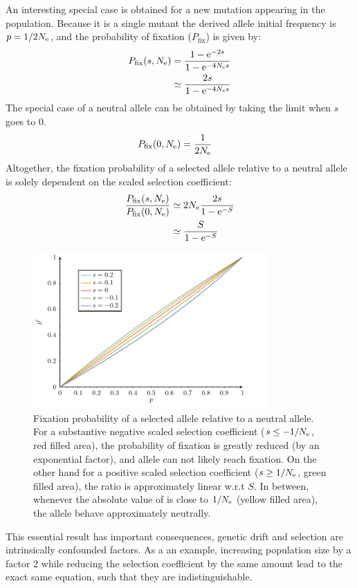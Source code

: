 An interesting special case is obtained for a new mutation appearing in the population.
Because it is a single mutant the derived \gls{allele} initial frequency is $p = 1 / 2 N_{\textrm{e}}$, and the probability of fixation ($P_{\mathrm{fix}}$) is given by:
\begin{align}
	P_{\mathrm{fix}}(s, N_{\textrm{e}}) & = \dfrac{1 - \mathrm{e}^{-2 s}}{1 - \mathrm{e}^{-4 N_{\textrm{e}} s}} \\
	 & \simeq  \dfrac{2 s }{1 - \mathrm{e}^{-4 N_{\textrm{e}} s}}
\end{align}
The special case of a \gls{neutral} \gls{allele} can be obtained by taking the limit when $s$ goes to $0$.
\begin{align}
P_{\mathrm{fix}}(0, N_{\textrm{e}}) & = \dfrac{1}{2 N_{\textrm{e}}}
\end{align}
Altogether, the fixation probability of a selected \gls{allele} relative to a \gls{neutral} \gls{allele} is solely dependent on the scaled selection coefficient:
\begin{align}
\dfrac{P_{\mathrm{fix}}(s, N_{\textrm{e}})}{P_{\mathrm{fix}}(0, N_{\textrm{e}})} & \simeq 2 N_{\textrm{e}} \dfrac{2s}{1 - \mathrm{e}^{-S}} \\
& \simeq  \dfrac{S}{1 - \mathrm{e}^{-S}} \label{eq:p-fix}
\end{align}
\begin{figure}[H]
	\begin{center}
		\includegraphics[width=0.8\textwidth, page=2] {figures.pdf}
	\end{center}
	\caption[Relative fixation probability]{Fixation probability of a selected \gls{allele} relative to a \gls{neutral} \gls{allele}.
	For a substantive negative scaled selection coefficient ($s \leq -1/N_{\textrm{e}}$, red filled area), the probability of fixation is greatly reduced (by an exponential factor), and \gls{allele} can not likely reach fixation. On the other hand for a positive scaled selection coefficient ($s \geq 1 / N_{\textrm{e}}$, green filled area), the ratio is approximately linear w.r.t $S$. In between, whenever the absolute value of is close to $1 / N_{\textrm{e}}$ (yellow filled area), the \gls{allele} behave approximately neutrally.}
\end{figure}
This essential result has important consequences, genetic drift and selection are intrinsically confounded factors.
As a an example, increasing population size by a factor $2$ while reducing the selection coefficient by the same amount lead to the exact same equation, such that they are indistinguishable.

